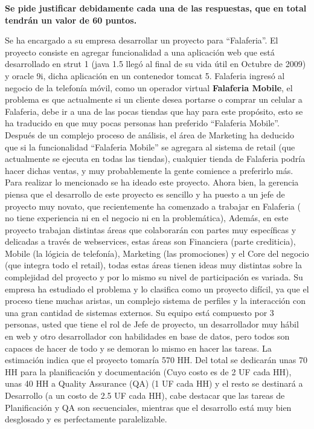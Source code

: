 \documentclass[10pt]{examdesign}
\begin{document}
\begin{shortanswer}[title={Pregunta de desarrollo}, rearrange=yes,resetcounter=yes]
{\bf Se pide justificar debidamente cada una de las respuestas, que en total tendrán un valor de 60 puntos.}

\begin{question}
	Se ha encargado a su empresa desarrollar un proyecto para ``Falaferia''. El proyecto consiste en agregar funcionalidad a una aplicación web que está desarrollado en strut 1 (java 1.5 llegó al final de su vida útil en Octubre de 2009) y oracle 9i, dicha aplicación en un contenedor tomcat 5.
	\newline
	Falaferia ingresó al negocio de la telefonía móvil, como un operador virtual {\bf Falaferia Mobile}, el problema es que actualmente si un cliente desea portarse o comprar un celular a Falaferia, debe ir a una de las pocas tiendas que hay para este propósito, esto se ha traducido en que muy pocas personas han preferido ``Falaferia Mobile''. Después de un complejo proceso de análisis, el área de Marketing ha deducido que si la funcionalidad ``Falaferia Mobile'' se agregara al sistema de retail (que actualmente se ejecuta en todas las tiendas), cualquier tienda de Falaferia podría hacer dichas ventas, y muy probablemente la gente comience a preferirlo más. Para realizar lo mencionado se ha ideado este proyecto.
	\newline
	Ahora bien, la gerencia piensa que el desarrollo de este proyecto es sencillo y ha puesto a un jefe de proyecto muy novato, que recientemente ha comenzado a trabajar en Falaferia ( no tiene experiencia ni en el negocio ni en la problemática), Además, en este proyecto trabajan distintas áreas que colaborarán con partes muy específicas y delicadas a través de webservices, estas áreas son Financiera (parte crediticia), Mobile (la lógicia de telefonía), Marketing (las promociones) y el Core del negocio (que integra todo el retail), todas estas áreas tienen ideas muy distintas sobre la complejidad del proyecto y por lo mismo su nivel de participación es variada. 
	\newline 
	Su empresa ha estudiado el problema y lo clasifica como un proyecto difícil, ya que el proceso tiene muchas aristas, un complejo sistema de perfiles y la interacción con una gran cantidad de sistemas externos.
	\newline
	Su equipo está compuesto por 3 personas, usted que tiene el rol de Jefe de proyecto, un desarrollador muy hábil en web y otro desarrollador con habilidades en base de datos, pero todos son capaces de hacer de todo y se demoran lo mismo en hacer las tareas. La estimación indica que el proyecto tomaría 570 HH. Del total se dedicarán unas 70 HH para la planificación y documentación (Cuyo costo es de 2 UF cada HH), unas 40 HH a Quality Assurance (QA) (1 UF cada HH) y el resto se destinará a Desarrollo (a un costo de 2.5 UF cada HH), cabe destacar que las tareas de Planificación y QA son secuenciales, mientras que el desarrollo está muy bien desglosado y es perfectamente paralelizable. 

\end{question}
\end{shortanswer}
\end{document}
